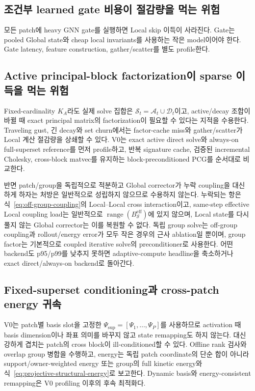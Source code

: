\documentclass[11pt,a4paper]{article}
\begin{document}
\subsection{조건부 learned gate 비용이 절감량을 먹는 위험}

모든 patch에 heavy GNN gate를 실행하면 Local skip 이득이 사라진다.
Gate는 pooled Global state와 cheap local invariants를 사용하는 작은 model이어야 한다.
Gate latency, feature construction, gather/scatter를 별도 profile한다.

\subsection{Active principal-block factorization이 sparse 이득을 먹는 위험}

Fixed-cardinality \(K_A\)라도 실제 solve 집합은 \(\mathcal S_t=\mathcal A_t\cup\mathcal D_t\)이고,
active/decay 조합이 바뀔 때 exact principal matrix의 factorization이 필요할 수 있다는 지적을 수용한다.
Traveling gust, 긴 decay와 set churn에서는 factor-cache miss와 gather/scatter가
Local 계산 절감량을 상쇄할 수 있다.
V0는 exact active direct solve와 always-on full-superset reference를 먼저 profile하고,
반복 signature cache, 검증된 incremental Cholesky, cross-block matvec를 유지하는
block-preconditioned PCG를 순서대로 비교한다.

반면 patch/group을 독립적으로 적분하고 Global corrector가 누락 coupling을 대신하게 하자는 처방은
일반적으로 성립하지 않으므로 수용하지 않는다.
누락되는 항은 식~\eqref{eq:off-group-coupling}의 Local--Local cross interaction이고,
same-step effective Local coupling load는 일반적으로
\(\operatorname{range}(B_{\mathcal S}^{\mathrm{eff}})\)에 있지 않으며,
Local state를 다시 풀지 않는 Global corrector는 이를 복원할 수 없다.
독립 group solve는 off-group coupling과 rollout/energy error가 모두 작은 경우의 근사 ablation일 뿐이며,
group factor는 기본적으로 coupled iterative solve의 preconditioner로 사용한다.
어떤 backend도 p95/p99를 낮추지 못하면 adaptive-compute headline을 축소하거나
exact direct/always-on backend로 돌아간다.

\subsection{Fixed-superset conditioning과 cross-patch energy 귀속}

V0는 patch별 basis slot을 고정한 \(\Psi_{\mathrm{sup}}=[\Psi_1,\ldots,\Psi_P]\)를 사용하므로
activation 때 basis dimension이나 좌표 의미를 바꾸지 않고 state remapping도 하지 않는다.
대신 강하게 겹치는 patch의 cross block이 ill-conditioned할 수 있다.
Offline rank 검사와 overlap group 병합을 수행하고,
energy는 독립 patch coordinate의 단순 합이 아니라 support/owner-weighted energy 또는
group의 full kinetic energy와 식~\eqref{eq:projective-structural-energy}로 보고한다.
Dynamic basis와 energy-consistent remapping은 V0 profiling 이후의 후속 최적화다.
\end{document}
